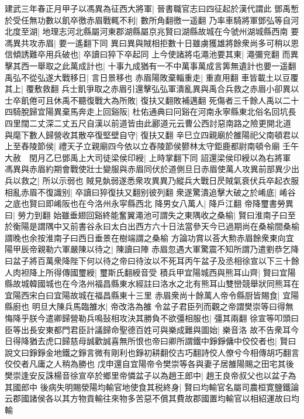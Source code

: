 建武三年春正月甲子以馮異為征西大將軍|{
	晉書職官志曰四征起於漢代謂此}
鄧禹慙於受任無功數以飢卒徼赤眉戰輒不利|{
	數所角翻徼一遥翻}
乃率車騎將軍鄧弘等自河北度至湖|{
	地理志河北縣屬河東郡湖縣屬京兆賢曰湖縣故城在今虢州湖城縣西南}
要馮異共攻赤眉|{
	要一遙翻下同}
異曰異與賊相拒數十日雖虜獲雄將餘衆尚多可稍以恩信傾誘難卒用兵破也|{
	卒讀曰猝下卒起同}
上今使諸將屯澠池要其東|{
	澠彌兖翻}
而異擊其西一舉取之此萬成計也|{
	十事九成猶有一不中萬事萬成言筭無遺計也要一遥翻}
禹弘不從弘遂大戰移日|{
	言日景移也}
赤眉陽敗棄輜重走|{
	重直用翻}
車皆載土以豆覆其上|{
	覆敷救翻}
兵士飢爭取之赤眉引還擊弘弘軍潰亂異與禹合兵救之赤眉小卻異以士卒飢倦可且休禹不聽復戰大為所敗|{
	復扶又翻敗補邁翻}
死傷者三千餘人禹以二十四騎脫歸宜陽異棄馬奔走上回谿阪|{
	杜佑通典曰冋谿在河南永寧縣東北俗名回坑長四里闊二丈深二丈五尺自漢以前道皆由此酈道元云曹公西討惡南路之險更開北道}
與麾下數人歸營收其散卒復堅壁自守|{
	復扶又翻}
辛巳立四親廟於雒陽祀父南頓君以上至舂陵節侯|{
	禮天子立親廟四今依以立舂陵節侯鬰林太守鉅鹿都尉南頓令廟}
壬午大赦　閏月乙巳鄧禹上大司徒梁侯印綬|{
	上時掌翻下同}
詔還梁侯印綬以為右將軍　馮異與赤眉約期會戰使壯士變服與赤眉同伏於道側旦日赤眉使萬人攻異前部異少出兵以救之|{
	所以示弱也}
賊見埶弱遂悉衆攻異異乃縱兵大戰日昃賊氣衰伏兵卒起衣服相亂赤眉不復識别|{
	卒讀曰猝復扶又翻别彼列翻}
衆遂驚潰追擊大破之於崤底|{
	崤谷之底也賢曰即崤阪也在今洛州永寜縣西北}
降男女八萬人|{
	降戶江翻}
帝降璽書勞異曰|{
	勞力到翻}
始雖垂翅回谿終能奮翼澠池可謂失之東隅收之桑榆|{
	賢曰淮南子曰至於衡陽是謂隅中又前書谷永曰太白出西方六十日法當參天今已過期尚在桑榆間桑榆謂晚也余按淮南子曰西日垂景在樹端謂之桑榆}
方論功賞以荅大勲赤眉餘衆東向宜陽甲辰帝親勒六軍嚴陳以待之|{
	陳讀曰陣}
赤眉忽遇大軍驚震不知所謂乃遣劉恭乞降曰盆子將百萬衆降陛下何以待之帝曰待汝以不死耳丙午盆子及丞相徐宣以下三十餘人肉袒降上所得傳國璽綬|{
	璽斯氏翻綬音受}
積兵甲宜陽城西與熊耳山齊|{
	賢曰宜陽縣故城韓國城也在今洛州福昌縣東水經註曰洛水之北有熊耳山雙巒競舉狀同熊耳在宜陽西宋白曰宜陽故城在福昌縣東十三里}
赤眉衆尚十餘萬人帝令縣厨皆賜食|{
	宜陽縣廚也}
明旦大陳兵馬臨雒水|{
	帝改洛為雒}
令盆子君臣列而觀之帝謂樊崇等曰得無悔降乎朕今遣卿歸營勒兵鳴鼔相攻決其勝負不欲彊相服也|{
	彊其兩翻}
徐宣等叩頭曰臣等出長安東都門君臣計議歸命聖德百姓可與樂成難與圖始|{
	樂音洛}
故不告衆耳今日得降猶去虎口歸慈母誠歡誠喜無所恨也帝曰卿所謂鐵中錚錚傭中佼佼者也|{
	賢曰說文曰錚錚金地鐵之錚言微有剛利也錚初耕翻佼古巧翻詩佼人僚兮今相傳胡巧翻言佼佼者凡庸之人稍為勝也}
戊申還自宜陽帝令樊崇等各與妻子居雒陽賜之田宅其後樊崇逢安反誅楊音徐宣卒於鄉里帝憐盆子以為趙王郎中|{
	趙王良帝叔父也以盆子為其國郎中}
後病失明賜滎陽均輸官地使食其税終身|{
	賢曰均輸官名屬司農桓寛鹽鐵論云郡國諸侯各以其方物貢輸往來物多苦惡不償其費故郡國置均輸官以相紹運故曰均輸}
